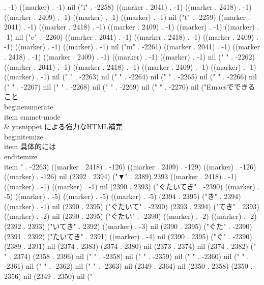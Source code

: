 . -1) ((marker) . -1) nil ("i" . -2258) ((marker . 2041) . -1) ((marker . 2418) . -1) ((marker . 2409) . -1) ((marker) . -1) ((marker) . -1) nil ("t" . -2259) ((marker . 2041) . -1) ((marker . 2418) . -1) ((marker . 2409) . -1) ((marker) . -1) ((marker) . -1) nil ("e" . -2260) ((marker . 2041) . -1) ((marker . 2418) . -1) ((marker . 2409) . -1) ((marker) . -1) ((marker) . -1) nil ("m" . -2261) ((marker . 2041) . -1) ((marker . 2418) . -1) ((marker . 2409) . -1) ((marker) . -1) ((marker) . -1) nil (" " . -2262) ((marker . 2041) . -1) ((marker . 2418) . -1) ((marker . 2409) . -1) ((marker) . -1) ((marker) . -1) nil ("
" . -2263) nil (" " . -2264) nil (" " . -2265) nil (" " . -2266) nil (" " . -2267) nil (" " . -2268) nil (" " . -2269) nil (" " . -2270) nil ("Emacsでできること
       \\begin{enumerate}
        \\item emmet-mode\\& yasnippet による強力なHTML補完
        \\begin{itemize}
         \\item 具体的には
        \\end{itemize}
        \\item " . -2263) ((marker . 2418) . -126) ((marker . 2409) . -129) ((marker) . -126) ((marker) . -126) nil (2392 . 2394) ("▼" . 2389) 2393 ((marker . 2418) . -1) ((marker) . -1) ((marker) . -1) nil (2390 . 2393) ("ぐたいてき" . -2390) ((marker) . -5) ((marker) . -5) ((marker) . -5) ((marker) . -5) (2394 . 2395) ("き" . 2394) ((marker) . -1) nil (2390 . 2395) ("ぐたいて" . -2390) (2393 . 2394) ("てき" . 2393) ((marker) . -2) nil (2390 . 2395) ("ぐたい" . -2390) ((marker) . -2) ((marker) . -2) (2392 . 2393) ("いてき" . 2392) ((marker) . -3) nil (2390 . 2395) ("ぐた" . -2390) (2391 . 2392) ("たいてき" . 2391) ((marker) . -4) nil (2390 . 2395) ("ぐ" . -2390) (2389 . 2391) nil (2374 . 2383) (2374 . 2380) nil (2373 . 2374) nil (2374 . 2382) ("         " . 2374) (2358 . 2396) nil (" " . -2358) nil (" " . -2359) nil (" " . -2360) nil (" " . -2361) nil (" " . -2362) nil (" " . -2363) nil (2349 . 2364) nil (2350 . 2358) (2350 . 2356) nil (2349 . 2350) nil ("
